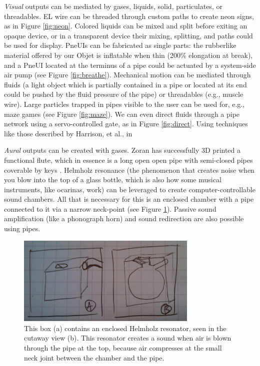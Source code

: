 \emph{Visual} outputs can be mediated by gases, liquids, solid, particulates, or threadables.  EL wire can be threaded through custom paths to create neon signs, as in Figure \ref{fig:neon}.  Colored liquids can be mixed and split before exiting an opaque device, or in a transparent device their mixing, splitting, and paths could be used for display.  PneUIs \cite{Yao-pneui} can be fabricated as single parts: the rubberlike material offered by our Objet is inflatable when thin (200\% elongation at break), and a PneUI located at the terminus of a pipe could be actuated by a system-side air pump (see Figure \ref{fig:breathe}).  Mechanical motion can be mediated through fluids (a light object which is partially contained in a pipe or located at its end could be pushed by the fluid pressure of the pipe) or threadables (e.g., muscle wire).  Large particles trapped in pipes visible to the user can be used for, e.g., maze games (see Figure \ref{fig:maze}).  We can even direct fluids through a pipe network using a servo-controlled gate, as in Figure \ref{fig:direct}.  Using techniques like those described by Harrison, et al., in \cite{Harrison-buttons}  

\emph{Aural} outputs can be created with gases.  Zoran has successfully 3D printed a functional flute, which in essence is a long open open pipe with semi-closed pipes coverable by keys \cite{Zoran-flute}.  Helmholz resonance (the phenomenon that creates noise when you blow into the top of a glass bottle, which is also how some musical instruments, like ocarinas, work) can be leveraged to create computer-controllable sound chambers.  All that is necessary for this is an enclosed chamber with a pipe connected to it via a narrow neck-point (see Figure \ref{fig:ocarina}).  Passive sound amplification (like a phonograph horn) and sound redirection are also possible using pipes.

\begin{figure}[h]
\centering
    \includegraphics[width=3.4in]{figures/placeholder/helmholz.jpg}
\caption{This box (a) contains an enclosed Helmholz resonator, seen in the cutaway view (b).  This resonator creates a sound when air is blown through the pipe at the top, because air compresses at the small neck joint between the chamber and the pipe.  }
\label{fig:ocarina}
\end{figure}

